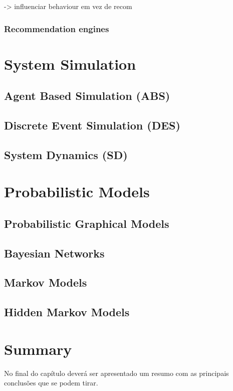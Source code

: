 -> influenciar behaviour em vez de recom

\subsubsection{Recommendation engines}

\cite{Adomavicius2005}

\section{System Simulation}

\subsection{Agent Based Simulation (ABS)}

\cite{Siebers2010}

\subsection{Discrete Event Simulation (DES)}

\cite{Siebers2010}

\subsection{System Dynamics (SD)}

\cite{Siebers2010}

\section{Probabilistic Models}

\subsection{Probabilistic Graphical Models}

\subsection{Bayesian Networks}

\subsection{Markov Models}

\subsection{Hidden Markov Models}

\cite{Rabiner1989}

\section{Summary}

No final do capítulo deverá ser apresentado um resumo com as 
principais conclusões que se podem tirar. 

